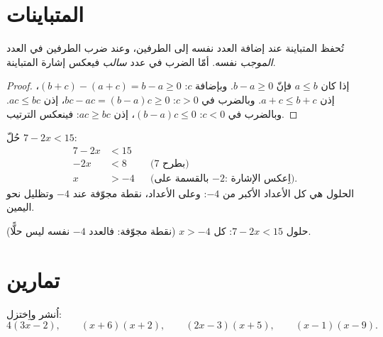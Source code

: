\section{المتباينات}

\begin{proposition}\label{prop:g9:algebra:ineq}
تُحفظ المتباينة عند إضافة العدد نفسه إلى الطرفين، وعند ضرب
الطرفين في العدد \emph{الموجب} نفسه. أمّا الضرب في عدد
\emph{سالب} فيعكس إشارة المتباينة.
\end{proposition}

\begin{proof}
إذا كان $a \leq b$ فإنّ $b - a \geq 0$. وبإضافة $c$: $(b+c) - (a+c) = b - a
\geq 0$، إذن $a + c \leq b + c$. وبالضرب في $c > 0$:
$bc - ac = (b-a)c \geq 0$، إذن $ac \leq bc$. وبالضرب في $c < 0$:
$(b-a)c \leq 0$، إذن $ac \geq bc$: فينعكس الترتيب.
\end{proof}

\begin{example}\label{ex:g9:algebra:ineq}
حُلّ $7 - 2x < 15$:
\begin{align*}
7 - 2x &< 15 \\
-2x &< 8 && \text{(بطرح 7)} \\
x &> -4 && \text{(بالقسمة على $-2$: اِعكس الإشارة).}
\end{align*}
الحلول هي كل الأعداد الأكبر من $-4$: وعلى  الأعداد، نقطة
مجوّفة عند $-4$ وتظليل نحو اليمين.
\end{example}

\begin{omfigure}

{\small حلول $7 - 2x < 15$: كل $x > -4$ (نقطة مجوّفة: فالعدد $-4$
نفسه ليس حلًّا).}
\end{omfigure}

\section{تمارين}

\begin{exercise}[$\star$]\label{exo:g9:algebra:1}
اُنشر واِختزل:
\[
4(3x - 2), \qquad
(x + 6)(x + 2), \qquad
(2x - 3)(x + 5), \qquad
(x - 1)(x - 9).
\]
\end{exercise}

